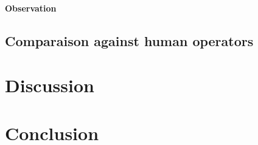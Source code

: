 \documentclass[french, 11pt]{memoir}
\begin{document}
\paragraph{Observation}

\subsection{Comparaison against human operators}

\section{Discussion}

\section{Conclusion}

\nocite{*}


\end{document}
